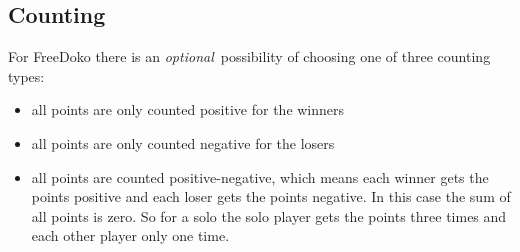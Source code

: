 \documentclass[12pt,a4paper]{article}
\newcommand{\optional}{\textit{optional}}
\begin{document}
\subsection{Counting} For FreeDoko
there is an \optional\ possibility of choosing one of three
counting types:
\begin{itemize}
\item all points are only counted positive for the winners
\item all points are only counted negative for the losers
\item all points are counted positive-negative, which means each winner gets the points positive
and each loser gets the points negative. In this case the sum of
all points is zero. So for a solo the solo player gets the points
three times and each other player only one time.
\end{itemize}
\end{document}
